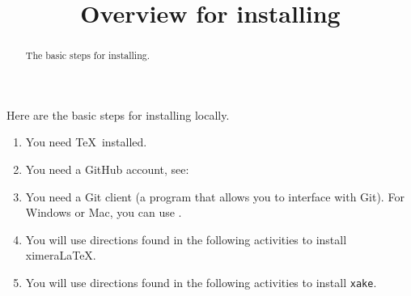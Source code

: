 \documentclass{ximera}
\title{Overview for installing}
\begin{document}
\begin{abstract}
  The basic steps for installing.
\end{abstract}
\maketitle

Here are the basic steps for installing locally.

\begin{enumerate}
\item You need \TeX\ installed.
\item You need a GitHub account, see:
\item You need a Git client (a program that allows you to interface
  with Git). For Windows or Mac, you can use .
\item You will use directions found in the following activities to
  install ximera\LaTeX.
\item You will use directions found in the following activities to
  install \verb|xake|.
\end{enumerate}
\end{document}
